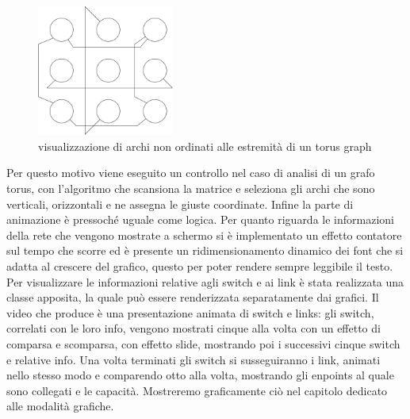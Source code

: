 \documentclass[binding=0.6cm]{sapthesis}
\begin{document}
\begin{figure}[h]
    \centering
    \includegraphics[width=0.4\textwidth]{immagini/archi_asimmetrici_torus.png}
    \caption{visualizzazione di archi non ordinati alle estremità di un torus graph}
    \label{fig:torus_archi_asimmetrici}
\end{figure}

Per questo motivo viene eseguito un controllo nel caso di analisi di un grafo torus, con l'algoritmo che scansiona la matrice e seleziona gli 
archi che sono verticali, orizzontali
e ne assegna le giuste coordinate.
Infine la parte di animazione è pressoché uguale come logica.
Per quanto riguarda le informazioni della rete che vengono mostrate a schermo si è implementato un effetto contatore sul tempo che scorre ed è presente
un ridimensionamento dinamico dei font che si adatta al crescere del grafico, questo per poter rendere sempre leggibile il testo.
Per visualizzare le informazioni relative agli switch e ai link è stata realizzata una classe apposita, la quale può essere renderizzata separatamente dai grafici.
Il video che produce è una presentazione animata di switch e links: gli switch, correlati con le loro info, vengono mostrati cinque alla volta con un effetto di comparsa e scomparsa, con effetto slide, mostrando poi i successivi cinque switch e relative info.
Una volta terminati gli switch si susseguiranno i link, animati nello stesso modo e comparendo otto alla volta, mostrando gli enpoints al quale sono collegati e le capacità. Mostreremo graficamente ciò nel capitolo dedicato alle modalità grafiche.
\end{document}

